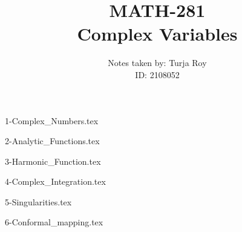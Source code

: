 \documentclass[12pt]{article}
\title{
    \textbf{MATH-281} \\
    \textbf{Complex Variables}
}
\author{
    Notes taken by: Turja Roy \\
    ID: 2108052
}
\date{}
\numberwithin{equation}{subsection}
\begin{document}
\maketitle

\tableofcontents

\newpage
{1-Complex_Numbers.tex}

\newpage
{2-Analytic_Functions.tex}

\newpage
{3-Harmonic_Function.tex}

\newpage
{4-Complex_Integration.tex}

\newpage
{5-Singularities.tex}

\newpage
{6-Conformal_mapping.tex}
\end{document}

